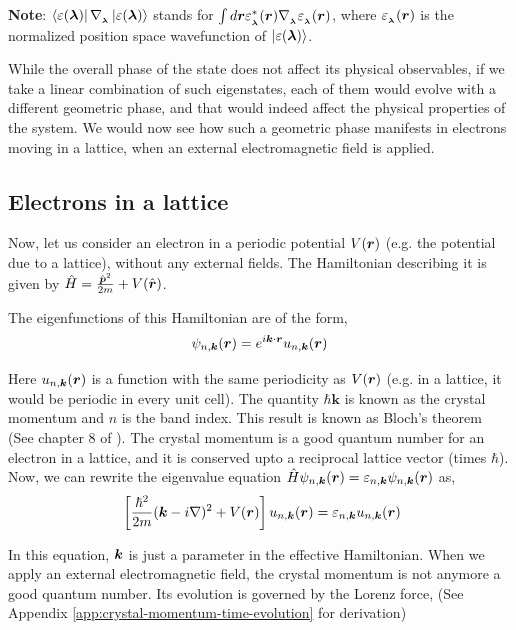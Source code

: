\documentclass{revtex4-2}
\newcommand{\bvec}[1]{{\mathbf #1}}
\renewcommand\vec[1]{\ensuremath\boldsymbol{#1}} %
\begin{document}
\textbf{Note}: $\bra{\varepsilon({\vec{\lambda}})}\nabla_{_{\vec{\lambda}}} \ket{\varepsilon({\vec{\lambda}})}$ stands for $\int d\vec{r} \varepsilon_{_{\vec{\lambda}}}^* (\vec{r}) \nabla_{_{\vec{\lambda}}} \varepsilon_{_{\vec{\lambda}}}(\vec{r})$, where $\varepsilon_{_{\vec{\lambda}}}(\vec{r})$ is the normalized position space wavefunction of $\ket{\varepsilon({\vec{\lambda}})}$.

While the overall phase of the state does not affect its physical observables, if we take a linear combination of such eigenstates, each of them would evolve with a different geometric phase, and that would indeed affect the physical properties of the system. We would now see how such a geometric phase manifests in electrons moving in a lattice, when an external electromagnetic field is applied.

\subsection{Electrons in a lattice}
Now, let us consider an electron in a periodic potential $V(\vec{r})$ (e.g. the potential due to a lattice), without any external fields. The Hamiltonian describing it is given by $\hat{H} = \frac{{\hat{\vec{p}}}^2}{2 m} + V(\hat{\vec{r}})$.

The eigenfunctions of this Hamiltonian are of the form,
$$\psi_{n, \vec{k}} (\vec{r}) = e^{i \vec{k}\cdot \vec{r}} u_{n,\vec{k}} (\vec{r})$$

Here $u_{n,\vec{k}} (\vec{r})$ is a function with the same periodicity as $V(\vec{r})$ (e.g. in a lattice, it would be periodic in every unit cell). The quantity $\hbar \bvec{k}$ is known as the crystal momentum and $n$ is the band index. This result is known as Bloch's theorem (See chapter 8 of \cite{book:AshcroftMermin76}). The crystal momentum is a good quantum number for an electron in a lattice, and it is conserved upto a reciprocal lattice vector (times $\hbar$).
Now, we can rewrite the eigenvalue equation $\hat{H} \psi_{n, \vec{k}}(\vec{r}) = \varepsilon_{n,\vec{k}} \psi_{n, \vec{k}}(\vec{r})$ as,
\begin{equation}~\label{Eq:effectiveBlochEquation}
	\left[\frac{\hbar^2}{2m}(\vec{k} - i \nabla)^2 + V(\vec{r}) \right]u_{n,\vec{k}} (\vec{r}) = \varepsilon_{n,\vec{k}} u_{n,\vec{k}} (\vec{r})
\end{equation}

In this equation, $\vec{k}$ is just a parameter in the effective Hamiltonian. When we apply an external electromagnetic field, the crystal momentum is not anymore a good quantum number. Its evolution is governed by the Lorenz force, (See Appendix \ref{app:crystal-momentum-time-evolution} for derivation)
\end{document}
